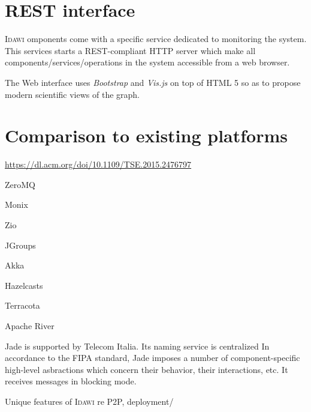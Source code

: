 \documentclass{article}
\newcommand{\idawi}[1]{\textsc{Idawi}\xspace}
\begin{document}
\section{REST interface}
\idawi components come with a specific service dedicated to monitoring the system. This services starts a REST-compliant HTTP server which make all components/services/operations in the system accessible from a web browser.

The Web interface uses \textit{Bootstrap} and \textit{Vis.js} on top of HTML 5 so as to propose modern scientific views of the graph.

\section{Comparison to existing platforms}

\url{https://dl.acm.org/doi/10.1109/TSE.2015.2476797}

ZeroMQ

Monix

Zio 

JGroups

Akka

Hazelcasts

Terracota

Apache River

Jade is supported by Telecom Italia.
Its naming service is centralized
In accordance to the FIPA standard, Jade imposes a number of component-specific high-level asbractions which concern their behavior, their interactions, etc.
It receives messages in blocking mode.

Unique features of \idawi are P2P, deployment/
\end{document}
